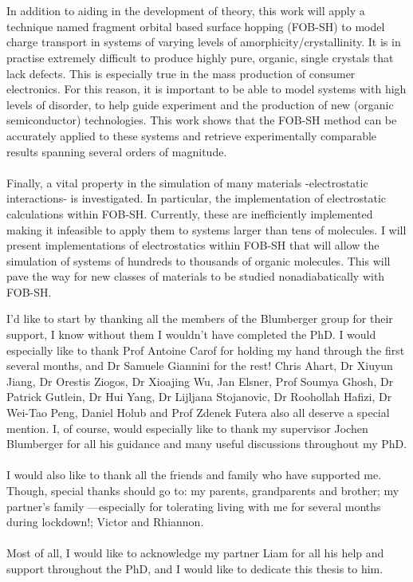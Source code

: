 \\\\
In addition to aiding in the development of theory, this work will apply a technique named fragment orbital based surface hopping (FOB-SH) to model charge transport in systems of varying levels of amorphicity/crystallinity. It is in practise extremely difficult to produce highly pure, organic, single crystals that lack defects. This is especially true in the mass production of consumer electronics. For this reason, it is important to be able to model systems with high levels of disorder, to help guide experiment and the production of new (organic semiconductor) technologies. This work shows that the FOB-SH method can be accurately applied to these systems and retrieve experimentally comparable results spanning several orders of magnitude.
\\\\
Finally, a vital property in the simulation of many materials -electrostatic interactions- is investigated. In particular, the implementation of electrostatic calculations within FOB-SH. Currently, these are inefficiently implemented making it infeasible to apply them to systems larger than tens of molecules. I will present  implementations of electrostatics within FOB-SH that will allow the simulation of systems of hundreds to thousands of organic molecules.  This will pave the way for new classes of materials to be studied nonadiabatically with FOB-SH.


\begin{acknowledgements}
I'd like to start by thanking all the members of the Blumberger group for their support, I know without them I wouldn't have completed the PhD. I would especially like to thank Prof Antoine Carof for holding my hand through the first several months, and Dr Samuele Giannini for the rest! Chris Ahart, Dr Xiuyun Jiang, Dr Orestis Ziogos, Dr Xioajing Wu, Jan Elsner, Prof Soumya Ghosh, Dr Patrick Gutlein, Dr Hui Yang, Dr Lijljana Stojanovic, Dr Roohollah Hafizi, Dr Wei-Tao Peng, Daniel Holub and Prof Zdenek Futera also all deserve a special mention. I, of course, would especially like to thank my supervisor Jochen Blumberger for all his guidance and many useful discussions throughout my PhD.
\\\\
I would also like to thank all the friends and family who have supported me. Though, special thanks should go to: my parents, grandparents and brother; my partner's family ---especially for tolerating  living with me for several months during lockdown!; Victor and Rhiannon.
\\\\
Most of all, I would like to acknowledge my partner Liam for all his help and support throughout the PhD, and I would like to dedicate this thesis to him.
\end{acknowledgements}

\setcounter{tocdepth}{2} 

\tableofcontents
\listoffigures
\listoftables

